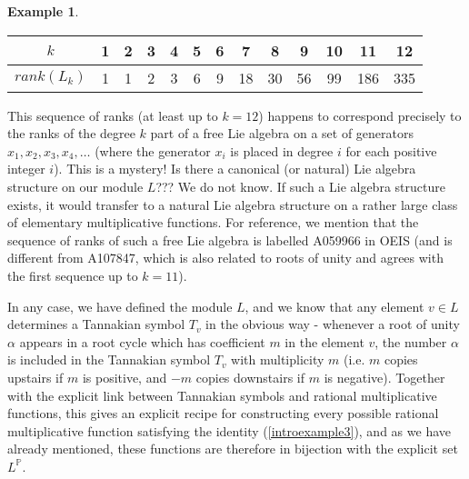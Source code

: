 \documentclass[a4paper]{article}
\theoremstyle{definition}
\newtheorem{example}{Example}[section]
\theoremstyle{remark}
\begin{document}
\begin{example}
\begin{enumerate}
\vspace{6pt}
\begin{tabular}{  | c || c | c | c | c | c | c | c | c | c | c | c | c |   }
  \hline			
  $k$ & 1 & 2 & 3 & 4 & 5 & 6 & 7 & 8 & 9 & 10 & 11 & 12   \\
  \hline
  $rank(L_k) $ & 1 & 1 & 2 & 3 & 6 & 9 & 18 & 30 & 56 & 99 & 186 & 335    \\
  \hline  
\end{tabular}
\vspace{6pt}

This sequence of ranks (at least up to $k=12$) happens to correspond precisely to the ranks of the degree $k$ part of a free Lie algebra on a set of generators $x_1, x_2, x_3, x_4, \ldots$ (where the generator $x_i$ is placed in degree $i$ for each positive integer $i$). This is a mystery! Is there a canonical (or natural) Lie algebra structure on our module $L$??? We do not know. If such a Lie algebra structure exists, it would transfer to a natural Lie algebra structure on a rather large class of elementary multiplicative functions. For reference, we mention that the sequence of ranks of such a free Lie algebra is labelled A059966 in OEIS (and is different from A107847, which is also related to roots of unity and agrees with the first sequence up to $k=11$). 

In any case, we have defined the module $L$, and we know that any element $v \in L$ determines a Tannakian symbol $T_v$ in the obvious way - whenever a root of unity $\alpha$ appears in a root cycle which has coefficient $m$ in the element $v$, the number $\alpha$ is included in the Tannakian symbol $T_v$ with multiplicity $m$ (i.e. $m$ copies upstairs if $m$ is positive, and $-m$ copies downstairs if $m$ is negative). Together with the explicit link between Tannakian symbols and rational multiplicative functions, this gives an explicit recipe for constructing every possible rational multiplicative function satisfying the identity (\ref{introexample3}), and as we have already mentioned, these functions are therefore in bijection with the explicit set $L^{\mathbb{P}}$.


\end{enumerate}
\end{example}
\end{document}
